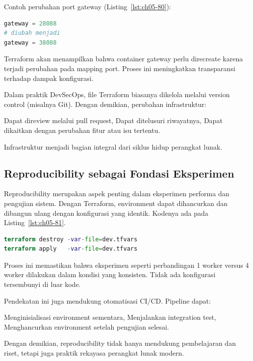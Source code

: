 Contoh perubahan port gateway (Listing~\ref{lst:ch05-80}):

\begin{lstlisting}[language=terraform, caption={Potongan kode Terraform pada Kontrol Perubahan yang Terstruktur}, label={lst:ch05-80}]
gateway = 28088
# diubah menjadi
gateway = 38088
\end{lstlisting}

Terraform akan menampilkan bahwa container gateway perlu direcreate karena terjadi perubahan pada mapping port. Proses ini meningkatkan transparansi terhadap dampak konfigurasi.

Dalam praktik DevSecOps, file Terraform biasanya dikelola melalui version control (misalnya Git). Dengan demikian, perubahan infrastruktur:

Dapat direview melalui pull request,  
Dapat ditelusuri riwayatnya,  
Dapat dikaitkan dengan perubahan fitur atau isu tertentu.  

Infrastruktur menjadi bagian integral dari siklus hidup perangkat lunak.

\subsection*{Reproducibility sebagai Fondasi Eksperimen}

Reproducibility merupakan aspek penting dalam eksperimen performa dan pengujian sistem. Dengan Terraform, environment dapat dihancurkan dan dibangun ulang dengan konfigurasi yang identik. Kodenya ada pada Listing~\ref{lst:ch05-81}.

\begin{lstlisting}[language=terraform, caption={Potongan kode Terraform pada Reproducibility sebagai Fondasi Eksperimen}, label={lst:ch05-81}]
terraform destroy -var-file=dev.tfvars
terraform apply   -var-file=dev.tfvars
\end{lstlisting}

Proses ini memastikan bahwa eksperimen seperti perbandingan 1 worker versus 4 worker dilakukan dalam kondisi yang konsisten. Tidak ada konfigurasi tersembunyi di luar kode.

Pendekatan ini juga mendukung otomatisasi CI/CD. Pipeline dapat:

Menginisialisasi environment sementara,  
Menjalankan integration test,  
Menghancurkan environment setelah pengujian selesai.  

Dengan demikian, reproducibility tidak hanya mendukung pembelajaran dan riset, tetapi juga praktik rekayasa perangkat lunak modern.

